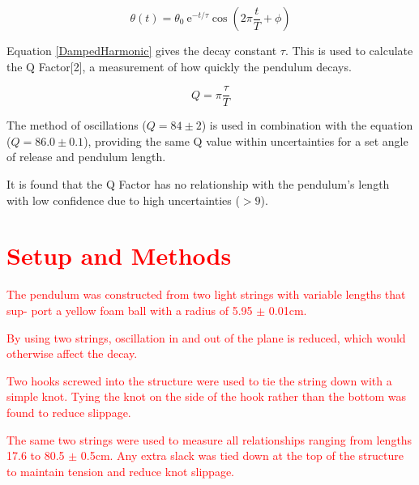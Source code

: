\documentclass[12pt,twocolumn]{article}
\newcommand{\e}{\mathrm{e}}
\begin{document}
\begin{equation} 
    \label{DampedHarmonic}
    \theta(t) = \theta_0 ~ \e^{-t/\tau} \cos{\left(2\pi \frac{t}{T}+\phi \right)}
\end{equation}

Equation \ref{DampedHarmonic} gives the decay constant $\tau$. This is
used to calculate the Q Factor[2], a measurement of how quickly the pendulum decays.

\begin{equation}
    \label{Q}
    Q = \pi \frac{\tau}{T}
\end{equation}

The method of oscillations ($Q = 84 \pm 2$) is used in combination with the equation ($Q = 86.0 \pm 0.1$), providing the same Q value within uncertainties for 
a set angle of release and pendulum length.

It is found that the Q Factor has no relationship with the pendulum's length with low confidence due to high uncertainties ($> 9$).

\section{\textcolor{red}{Setup and Methods}}

\textcolor{red}{The pendulum was constructed from two
light strings with variable lengths that sup-
port a yellow foam ball with a radius of 5.95
$\pm$ 0.01cm.} 

\textcolor{red}{By using two strings, oscillation in and
out of the plane is reduced, which would
otherwise affect the decay.}

\textcolor{red}{Two hooks screwed into the structure were
used to tie the string down with a simple
knot. Tying the knot on the side of the hook
rather than the bottom was found to reduce
slippage.}

\textcolor{red}{The same two strings were used to measure
all relationships ranging from lengths 17.6 to
80.5 $\pm$ 0.5cm. Any extra slack was tied down
at the top of the structure to maintain tension
and reduce knot slippage.}
\end{document}

